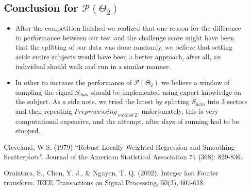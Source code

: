 \subsection{Conclusion for $\mathcal{P}(\Theta_{2})$}

\begin{itemize}
	\item After the competition finished we realized that one reason for the difference in performance between our test and the challenge score might have been that the splitting of our data was done randomly, we believe that setting aside entire subjects would have been a better approach, after all, an individual should walk and run in a similar manner.
	\item In other to increase the performance of $\mathcal{P}(\Theta_{2})$ we believe a window of sampling the signal $S_{data}$ should be implemented using expert knowledge on the subject. As a side note, we tried the latest by splitting $S_{data}$ into 3 sectors and then repeating $Preprocessing_{ \ method \ 2}$. unfortunately, this is very computational expensive, and the attempt, after days of running had to be stooped.
	
\end{itemize}



\begin{thebibliography}{1}
Cleveland, W.S. (1979) “Robust Locally Weighted Regression and Smoothing Scatterplots”. Journal of the American Statistical Association 74 (368): 829-836.

Oraintara, S., Chen, Y. J., \& Nguyen, T. Q. (2002). Integer fast Fourier transform. IEEE Transactions on Signal Processing, 50(3), 607-618.

\end{thebibliography}

